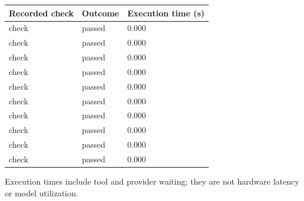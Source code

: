 \documentclass[11pt,a4paper]{article}
\begin{document}
{\small\renewcommand{\arraystretch}{1.18}\begin{longtable}{@{}L{0.57\textwidth}|L{0.16\textwidth}|L{0.17\textwidth}@{}}\toprule

\textbf{Recorded check} & \textbf{Outcome} & \textbf{Execution time (\allowbreak{}s)\allowbreak{}}\\\midrule\endhead

check & passed & 0.000\\[2pt]\hline

check & passed & 0.000\\[2pt]\hline

check & passed & 0.000\\[2pt]\hline

check & passed & 0.000\\[2pt]\hline

check & passed & 0.000\\[2pt]\hline

check & passed & 0.000\\[2pt]\hline

check & passed & 0.000\\[2pt]\hline

check & passed & 0.000\\[2pt]\hline

check & passed & 0.000\\[2pt]\hline

check & passed & 0.000\\[2pt]\hline

\bottomrule\end{longtable}}

Execution times include tool and provider waiting; they are not hardware latency or model utilization.
\end{document}
